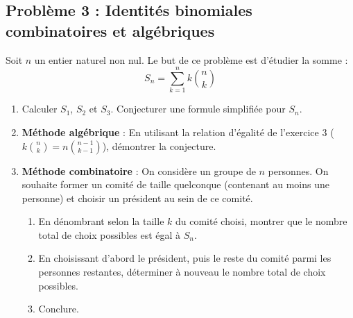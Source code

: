 \subsection*{Problème 3 : Identités binomiales combinatoires et algébriques}
Soit $n$ un entier naturel non nul. Le but de ce problème est d'étudier la somme :
\[
S_n = \sum_{k=1}^n k \binom{n}{k}
\]
\begin{enumerate}
    \item Calculer $S_1$, $S_2$ et $S_3$. Conjecturer une formule simplifiée pour $S_n$.
    \item \textbf{Méthode algébrique} : En utilisant la relation d'égalité de l'exercice 3 ($k \binom{n}{k} = n \binom{n-1}{k-1}$), démontrer la conjecture.
    \item \textbf{Méthode combinatoire} : On considère un groupe de $n$ personnes. On souhaite former un comité de taille quelconque (contenant au moins une personne) et choisir un président au sein de ce comité.
    \begin{enumerate}
        \item En dénombrant selon la taille $k$ du comité choisi, montrer que le nombre total de choix possibles est égal à $S_n$.
        \item En choisissant d'abord le président, puis le reste du comité parmi les personnes restantes, déterminer à nouveau le nombre total de choix possibles.
        \item Conclure.
    \end{enumerate}
\end{enumerate}

